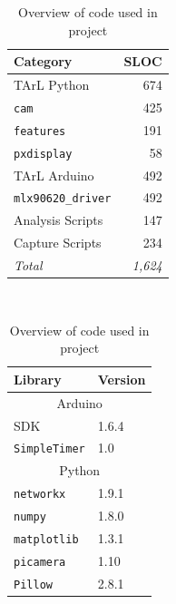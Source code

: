 \documentclass[../thesis/thesis.tex]{subfiles}
\begin{document}
\begin{table}
\centering
\begin{subtable}[b]{0.5\textwidth}
\centering
\begin{tabular}{|l|r|}
\hline
\textbf{Category} & \textbf{SLOC}  \\ \hline
TArL Python       & 674            \\ \hline
\hspace{5mm}\texttt{cam}        & 425           \\ \hline
\hspace{5mm}\texttt{features}   & 191           \\ \hline
\hspace{5mm}\texttt{pxdisplay}  & 58            \\ \hline
TArL Arduino  & 492            \\ \hline
\hspace{5mm}\texttt{mlx90620\_driver}  & 492          \\ \hline
Analysis Scripts  & 147            \\ \hline
Capture Scripts   & 234            \\ \hline
\textit{Total}    & \textit{1,624} \\ \hline
\end{tabular}
\caption{Source Lines Of Code written}
\end{subtable}%
~%
\begin{subtable}[b]{0.5\textwidth}
\centering
\begin{tabular}{|l|l|}
\hline
\textbf{Library}     & \multicolumn{1}{l|}{\textbf{Version}} \\ \hline
\multicolumn{2}{|c|}{Arduino}                                \\ \hline
SDK                  & 1.6.4                                 \\ \hline
\texttt{SimpleTimer} & 1.0                                   \\ \hline
\multicolumn{2}{|c|}{Python}                                 \\ \hline
\texttt{networkx}    & 1.9.1                                 \\ \hline
\texttt{numpy}       & 1.8.0                                 \\ \hline
\texttt{matplotlib}  & 1.3.1                                 \\ \hline
\texttt{picamera}    & 1.10                                  \\ \hline
\texttt{Pillow}      & 2.8.1                                 \\ \hline
\end{tabular}
\caption{Libraries used}
\end{subtable}
\caption{Overview of code used in project}
\end{table}
\end{document}

